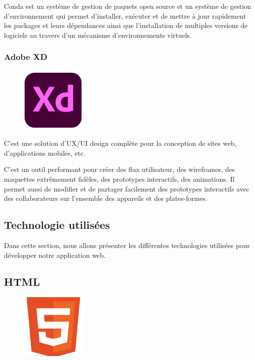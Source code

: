 Conda est un système de gestion de paquets open source et un système de gestion
d’environnement qui permet d’installer, exécuter et de mettre à jour rapidement
les packages et leurs dépendances ainsi que l’installation de multiples versions
de logiciels au travers d’un mécanisme d’environnements virtuels\cite{44}.

\subsubsection*{Adobe XD}
\begin{figure}
    \vspace{-22pt}
    \begin{center}
        \includegraphics[scale=0.36]{images/logo/adobexd.png}
        \label{fig69}
    \end{center}
    \vspace{-20pt}
    \vspace{-10pt}
\end{figure}

C’est une solution d’UX/UI design complète pour la conception de sites web, 
d’applications mobiles, etc.

C’est un outil performant pour créer des flux utilisateur, des wireframes, des
maquettes extrêmement fidèles, des prototypes interactifs, des animations. Il
permet aussi de modifier et de partager facilement des prototypes interactifs
avec des collaborateurs sur l’ensemble des appareils et des
plates-formes\cite{45}.

\subsection{Technologie utilisées}
Dans cette section, nous allons présenter les différentes technologies utilisées
pour développer notre application web.

\subsection{HTML}
\begin{figure}
    \vspace{-22pt}
    \begin{center}
        \includegraphics[scale=0.36]{images/logo/html.png}
        \label{fig70}
    \end{center}
    \vspace{-20pt}
    \vspace{-10pt}
\end{figure}

